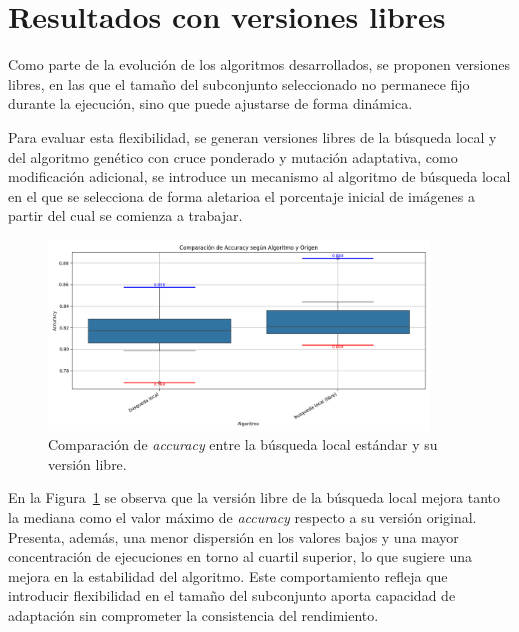 \section{Resultados con versiones libres}\label{sec:resultados-versiones-libres}
Como parte de la evolución de los algoritmos desarrollados, se proponen versiones libres,
en las que el tamaño del subconjunto seleccionado no permanece fijo durante la ejecución, sino que puede ajustarse de forma dinámica.

Para evaluar esta flexibilidad, se generan versiones libres de la búsqueda local y del algoritmo genético con cruce ponderado y mutación adaptativa,
como modificación adicional, se introduce un mecanismo al algoritmo de búsqueda local
en el que se selecciona de forma aletarioa el porcentaje inicial de imágenes a partir del cual se comienza a trabajar.


\begin{figure}[htp]
    \centering
    \includegraphics[width=0.9\textwidth]{imagenes/evaluaciones/libres/comparacion_bl}
    \caption{Comparación de \textit{accuracy} entre la búsqueda local estándar y su versión libre.}
    \label{fig:bl_libre}
\end{figure}

En la Figura~\ref{fig:bl_libre} se observa que la versión libre de la búsqueda local mejora tanto la mediana
como el valor máximo de \textit{accuracy} respecto a su versión original.
Presenta, además, una menor dispersión en los valores bajos y una mayor concentración de ejecuciones en torno al cuartil superior,
lo que sugiere una mejora en la estabilidad del algoritmo.
Este comportamiento refleja que introducir flexibilidad en el tamaño del subconjunto aporta capacidad de adaptación sin comprometer la consistencia del rendimiento.


